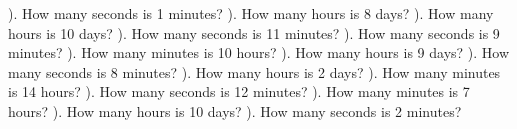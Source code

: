 \documentclass{article}%
\begin{document}
\newline%
\newline%
). How many seconds is 1 minutes?%
\newline%
\newline%
). How many hours is 8 days?%
\newline%
\newline%
). How many hours is 10 days?%
\newline%
\newline%
). How many seconds is 11 minutes?%
\newline%
\newline%
). How many seconds is 9 minutes?%
\newline%
\newline%
). How many minutes is 10 hours?%
\newline%
\newline%
). How many hours is 9 days?%
\newline%
\newline%
). How many seconds is 8 minutes?%
\newline%
\newline%
). How many hours is 2 days?%
\newline%
\newline%
). How many minutes is 14 hours?%
\newline%
\newline%
). How many seconds is 12 minutes?%
\newline%
\newline%
). How many minutes is 7 hours?%
\newline%
\newline%
). How many hours is 10 days?%
\newline%
\newline%
). How many seconds is 2 minutes?%
\newline%
\end{document}
